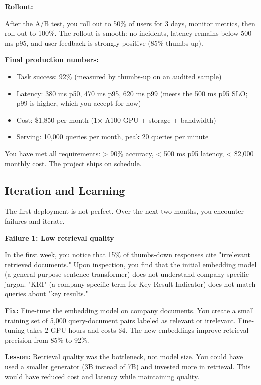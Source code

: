 \textbf{Rollout:}

After the A/B test, you roll out to 50\% of users for 3 days, monitor metrics, then roll out to 100\%. The rollout is smooth: no incidents, latency remains below 500 ms p95, and user feedback is strongly positive (85\% thumbs up).

\textbf{Final production numbers:}

\begin{itemize}
\item Task success: 92\% (measured by thumbs-up on an audited sample)
\item Latency: 380 ms p50, 470 ms p95, 620 ms p99 (meets the 500 ms p95 SLO; p99 is higher, which you accept for now)
\item Cost: \$1,850 per month (1$\times$ A100 GPU + storage + bandwidth)
\item Serving: 10,000 queries per month, peak 20 queries per minute
\end{itemize}

You have met all requirements: > 90\% accuracy, < 500 ms p95 latency, < \$2,000 monthly cost. The project ships on schedule.

\vspace{1em}

\subsection{Iteration and Learning}

The first deployment is not perfect. Over the next two months, you encounter failures and iterate.

\textbf{Failure 1: Low retrieval quality}

In the first week, you notice that 15\% of thumbs-down responses cite "irrelevant retrieved documents." Upon inspection, you find that the initial embedding model (a general-purpose sentence-transformer) does not understand company-specific jargon. "KRI" (a company-specific term for Key Result Indicator) does not match queries about "key results."

\textbf{Fix:} Fine-tune the embedding model on company documents. You create a small training set of 5,000 query-document pairs labeled as relevant or irrelevant. Fine-tuning takes 2 GPU-hours and costs \$4. The new embeddings improve retrieval precision from 85\% to 92\%.

\textbf{Lesson:} Retrieval quality was the bottleneck, not model size. You could have used a smaller generator (3B instead of 7B) and invested more in retrieval. This would have reduced cost and latency while maintaining quality.

